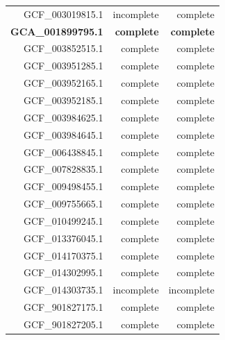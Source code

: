 \documentclass[sn-mathphys,Numbered]{sn-jnl}  %
\theoremstyle{thmstyleone}%
\theoremstyle{thmstyletwo}%
\theoremstyle{thmstylethree}%
\begin{document}
\begin{appendices}
\begin{table}[h!]
\begin{tabular}{rrr}
                GCF\_003019815.1 & incomplete             & complete                   \\
                \textbf{GCA\_001899795.1} & \textbf{complete}    &   \textbf{complete} \\
                GCF\_003852515.1 & complete               & complete                   \\
                GCF\_003951285.1 & complete               & complete                   \\
                GCF\_003952165.1 & complete               & complete                   \\
                GCF\_003952185.1 & complete               & complete                   \\
                GCF\_003984625.1 & complete               & complete                   \\
                GCF\_003984645.1 & complete               & complete                   \\
                GCF\_006438845.1 & complete               & complete                   \\
                GCF\_007828835.1 & complete               & complete                   \\
                GCF\_009498455.1 & complete               & complete                   \\
                GCF\_009755665.1 & complete               & complete                   \\
                GCF\_010499245.1 & complete               & complete                   \\
                GCF\_013376045.1 & complete               & complete                   \\
                GCF\_014170375.1 & complete               & complete                   \\
                GCF\_014302995.1 & complete               & complete                   \\
                GCF\_014303735.1 & incomplete             & incomplete                 \\
                GCF\_901827175.1 & complete               & complete                   \\ 
                GCF\_901827205.1 & complete               & complete              
            \end{tabular}
        \end{table}
    


\end{appendices}
\end{document}
